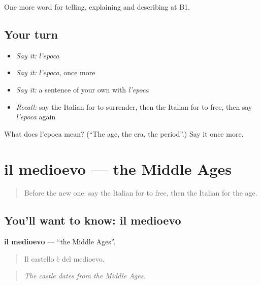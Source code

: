 \begin{grammarlens}[title={What you've built}]
One more word for telling, explaining and describing at B1.
\end{grammarlens}

\subsection*{Your turn}
\begin{itemize}
\raggedright
  \item \emph{Say it:} \emph{l'epoca}
  \item \emph{Say it:} \emph{l'epoca}, once more
  \item \emph{Say it:} a sentence of your own with \emph{l'epoca}
  \item \emph{Recall:} say the Italian for to surrender, then the Italian for to free, then say \emph{l'epoca} again
\end{itemize}

\begin{tcolorbox}[breakable,colback=teal!4,colframe=teal!35!black,title={Before you move on}]
What does l'epoca mean? (\textquotedblleft{}The age, the era, the period\textquotedblright{}.) Say it once more.
\end{tcolorbox}
\section[il medioevo]{il medioevo — the Middle Ages}

\label{lesson:IT-C330-medioevo}



\begin{quote}
Before the new one: say the Italian for to free, then the Italian for the age.
\end{quote}

\subsection*{You'll want to know: il medioevo}
\textbf{il medioevo} — \textquotedblleft{}the Middle Ages\textquotedblright{}.

\begin{quote}
Il castello è del medioevo.
\end{quote}

\begin{quote}
\emph{The castle dates from the Middle Ages.}
\end{quote}

